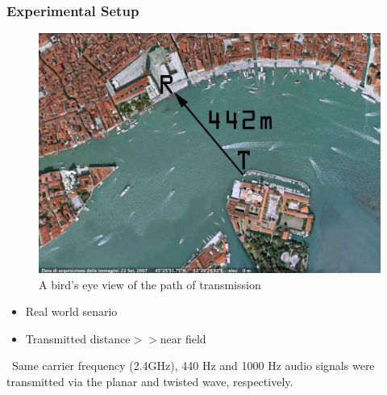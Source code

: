 \documentclass[xcolor=dvipsnames]{beamer}
\newenvironment{items}[1][]
{\begin{itemize}
    \ifthenelse{\isempty{#1}}
    {\setlength{\itemsep}{12pt}}{\setlength{\itemsep}{#1}}}
  {\end{itemize}}
\begin{document}
\begin{frame}
	\frametitle{Experimental Setup}
	\begin{minipage}{0.49\textwidth}
		\begin{figure}
		\includegraphics[width=\textwidth]{birdeyeview}
		\caption{A bird's eye view of the path of transmission}
		\label{pic:birdeye}
		\end{figure}
	\end{minipage}
	\begin{minipage}{0.49\textwidth}
		\begin{items}
		\item Real world senario
		\item Transmitted distance$>>$near field
		\end{items}
	\end{minipage}
\end{frame}
\begin{frame}
\
Same carrier frequency (2.4GHz), 440 Hz and 1000 Hz audio signals were transmitted via the planar and twisted wave, respectively.
\end{frame}
\end{document}
